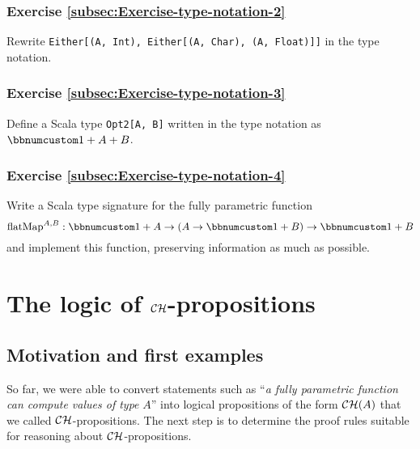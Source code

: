 \subsubsection{Exercise \label{subsec:Exercise-type-notation-2}\ref{subsec:Exercise-type-notation-2}}

Rewrite \lstinline!Either[(A, Int), Either[(A, Char), (A, Float)]]!
in the type notation. 

\subsubsection{Exercise \label{subsec:Exercise-type-notation-3}\ref{subsec:Exercise-type-notation-3}}

Define a Scala type \lstinline!Opt2[A, B]! written in the type notation
as $\bbnum 1+A+B$.

\subsubsection{Exercise \label{subsec:Exercise-type-notation-4}\ref{subsec:Exercise-type-notation-4}}

Write a Scala type signature for the fully parametric function 
\[
\text{flatMap}^{A,B}:\bbnum 1+A\rightarrow\left(A\rightarrow\bbnum 1+B\right)\rightarrow\bbnum 1+B
\]
and implement this function, preserving information as much as possible.

\section{The logic of ${\cal CH}$-propositions}

\subsection{Motivation and first examples\label{subsec:ch-Motivation-and-first-examples}}

So far, we were able to convert statements such as \textsf{``}\emph{a fully
parametric function can compute values of type} $A$\textsf{''} into logical
propositions of the form ${\cal CH}(A)$ that we called ${\cal CH}$-propositions.
The next step is to determine the proof rules suitable for reasoning
about ${\cal CH}$-propositions.

